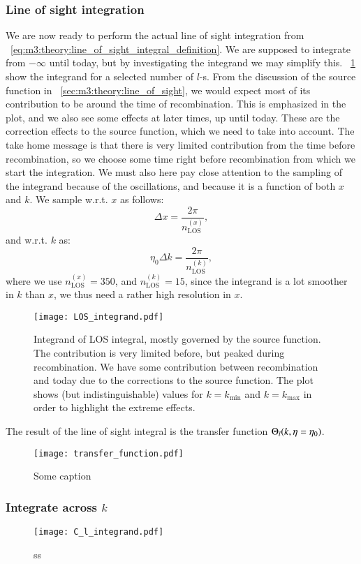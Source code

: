     \subsubsection{Line of sight integration}
        We are now ready to perform the actual line of sight integration from ~\cref{eq:m3:theory:line_of_sight_integral_definition}. We are supposed to integrate from $-\infty$ until today, but by investigating the integrand we may simplify this. ~\cref{fig:m4:LOS_integrand} show the integrand for a selected number of $l$-s. From the discussion of the source function in ~\cref{sec:m3:theory:line_of_sight}, we would expect most of its contribution to be around the time of recombination. This is emphasized in the plot, and we also see some effects at later times, up until today. These are the correction effects to the source function, which we need to take into account. The take home message is that there is very limited contribution from the time before recombination, so we choose some time right before recombination from which we start the integration. We must also here pay close attention to the sampling of the integrand because of the oscillations, and because it is a function of both $x$ and $k$. We sample w.r.t. $x$ as follows:
        \begin{equation}
            \Delta x = \frac{2\pi}{n_\mathrm{LOS}^{(x)}},
        \end{equation}
        and w.r.t. $k$ as:
        \begin{equation}
            \eta_0\Delta k = \frac{2\pi}{n_\mathrm{LOS}^{(k)}},
        \end{equation}
        where we use $n_\mathrm{LOS}^{(x)}=350$, and $n_\mathrm{LOS}^{(k)}=15$, since the integrand is a lot smoother in $k$ than $x$, we thus need a rather high resolution in $x$. 

        \begin{figure}
            \texttt{[image: LOS\_integrand.pdf]}
            \caption{Integrand of LOS integral, mostly governed by the source function. The contribution is very limited before, but peaked during recombination. We have some contribution between recombination and today due to the corrections to the source function. The plot shows (but indistinguishable) values for $k=k_\mathrm{min}$ and $k=k_\mathrm{max}$ in order to highlight the extreme effects.}
            \label{fig:m4:LOS_integrand}
        \end{figure}

        The result of the line of sight integral is the transfer function $\Theta_l(k, \eta=\eta_0)$.
        \begin{figure}
            \texttt{[image: transfer\_function.pdf]}
            \caption{Some caption}
            \label{fig:m3:some}
        \end{figure}
    \subsubsection{Integrate across $k$}

        \begin{figure}
            \texttt{[image: C\_l\_integrand.pdf]}
            \caption{ss}
            \label{fig:m3:some}
        \end{figure}

